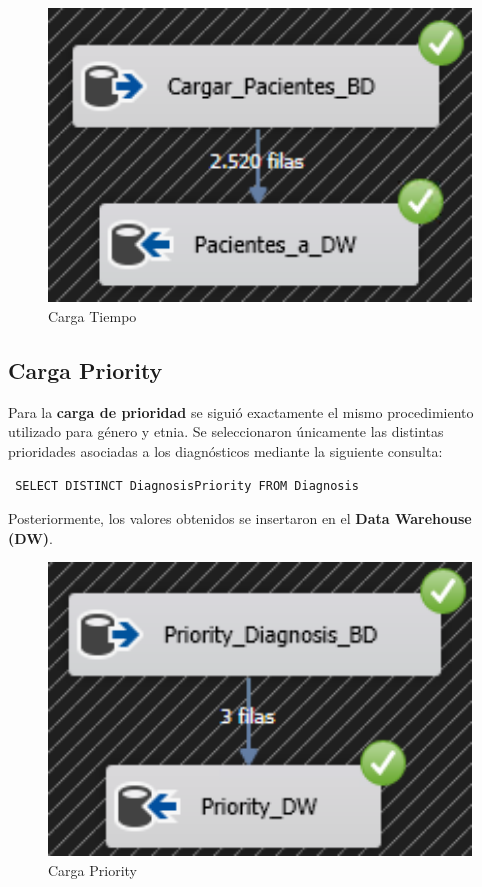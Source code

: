 \documentclass[12pt, a4paper, twoside]{article}
\begin{document}
	\begin{figure}[H]
		\centering
		\includegraphics[width=1\textwidth]{image/109_carga_tiempo.png}
		\caption{Carga Tiempo}
		\label{fig:18}
	\end{figure}
	
	\subsection{Carga Priority}
	
	Para la \textbf{carga de prioridad} se siguió exactamente el mismo procedimiento utilizado para género y etnia. Se seleccionaron únicamente las distintas prioridades asociadas a los diagnósticos mediante la siguiente consulta:
	
	\begin{verbatim} SELECT DISTINCT DiagnosisPriority FROM Diagnosis \end{verbatim}
	
	Posteriormente, los valores obtenidos se insertaron en el \textbf{Data Warehouse (DW)}.
	
	\begin{figure}[H]
		\centering
		\includegraphics[width=1\textwidth]{image/111_carga_priority.png}
		\caption{Carga Priority}
		\label{fig:20}
	\end{figure}
	
\end{document}
